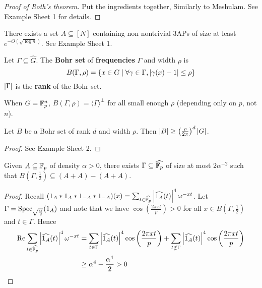 \documentclass{article}
\begin{document}
\begin{proof}[Proof of Roth's theorem]
  Put the ingredients together, Similarly to Meshulam. See Example Sheet 1 for details.
\end{proof}

\begin{eg}
  There exists a set $A \subseteq [N]$ containing non nontrivial 3APs of size at least $e^{-O(\sqrt{\log n})}$. See Example Sheet 1.
\end{eg}

\begin{dfn}
  Let $\Gamma \subseteq \hat G$. The {\bf Bohr set} of {\bf frequencies} $\Gamma$ and width $\rho$ is
  $$B(\Gamma, \rho) = \{x \in G \mid \forall \gamma \in \Gamma, \left\lvert \gamma(x) - 1\right\rvert \le \rho\}$$
  $\left\lvert \Gamma\right\rvert$ is the {\bf rank} of the Bohr set.
\end{dfn}

\begin{eg}
  When $G = \mathbb F_p^n$, $B(\Gamma, \rho) = \langle\Gamma\rangle^\perp$ for all small enough $\rho$ (depending only on $p$, not $n$).
\end{eg}

\begin{lem}
  Let $B$ be a Bohr set of rank $d$ and width $\rho$. Then $\left\lvert B\right\rvert \ge \left(\frac\rho{2\pi}\right)^d\left\lvert G\right\rvert$.
\end{lem}
\begin{proof}
  See Example Sheet 2.
\end{proof}

\newlec

\begin{lem}[Bogolyubov]
  Given $A \subseteq \mathbb F_p$ of density $\alpha > 0$, there exists $\Gamma \subseteq \widehat{\mathbb F_p}$ of size at most $2\alpha^{-2}$ such that $B(\Gamma, \frac 12) \subseteq (A + A) - (A + A)$.
\end{lem}
\begin{proof}
  Recall $(1_A \ast 1_A \ast 1_{-A} \ast 1_{-A})(x) = \sum_{t \in \widehat{\mathbb F_p}} \left\lvert \widehat{1_A}(t)\right\rvert^4 \omega^{-xt}$. Let $\Gamma = \operatorname{Spec}_{\sqrt{\frac\alpha 2}}(1_A)$ and note that we have $\cos(\frac{2\pi xt}p) > 0$ for all $x \in B(\Gamma, \frac 12)$ and $t \in \Gamma$. Hence
  \begin{align*}
    \operatorname{Re} \sum_{t \in \widehat{\mathbb F_p}} \left\lvert \widehat{1_A}(t)\right\rvert^4 \omega^{-xt}
    & = \sum_{t \in \Gamma} \left\lvert \widehat{1_A}(t)\right\rvert^4 \cos\left(\frac{2\pi xt}p\right) + \sum_{t \notin \Gamma} \left\lvert \widehat{1_A}(t)\right\rvert^4 \cos\left(\frac{2\pi xt}p\right) \\
    & \ge \alpha^4 - \frac{\alpha^4}2 > 0
  \end{align*}
\end{proof}
\end{document}
